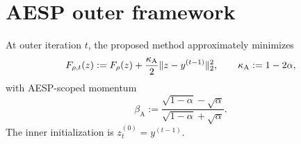 \section{AESP outer framework}

At outer iteration $t$, the proposed method approximately minimizes
\begin{equation}
  F_{\rho,t}(z):=F_\rho(z)
  +\frac{\kappa_{\mathrm A}}{2}
       \lVert z-y^{(t-1)}\rVert_2^2,
  \qquad \kappa_{\mathrm A}:=1-2\alpha,
  \label{eq:aesp-cd-subproblem}
\end{equation}
with AESP-scoped momentum
\begin{equation}
  \beta_{\mathrm A}
  :=\frac{\sqrt{1-\alpha}-\sqrt\alpha}
          {\sqrt{1-\alpha}+\sqrt\alpha}.
  \label{eq:aesp-cd-momentum}
\end{equation}
The inner initialization is $z_t^{(0)}=y^{(t-1)}$.
